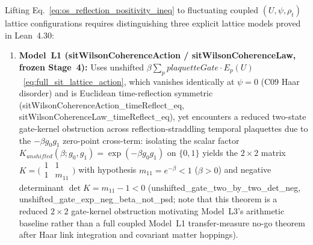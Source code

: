\documentclass[american,11pt,letterpaper]{article}
\def\mathrm#1{#1}%
\def\texttt#1{#1}%
\def\emph#1{#1}%
\begin{document}
Lifting Eq.~\eqref{eq:os_reflection_positivity_ineq} to fluctuating coupled $(U, \psi, \rho_t)$ lattice configurations requires distinguishing three explicit lattice models proved in Lean~4.30:
\begin{enumerate}[leftmargin=2em]
  \item \textbf{Model~L1 (\texttt{sit\allowbreak{}Wilson\allowbreak{}Coherence\allowbreak{}Action} / \texttt{sitWilsonCoherenceLaw}, frozen Stage~4):} Uses unshifted $\beta\sum_p \mathrm{plaquetteGate}\cdot E_p(U)$~\eqref{eq:full_sit_lattice_action}, which vanishes identically at $\psi = 0$ (\texttt{C09} Haar disorder) and is Euclidean time-reflection symmetric (\texttt{sit\allowbreak{}Wilson\allowbreak{}Coherence\allowbreak{}Action\_\allowbreak{}time\allowbreak{}Reflect\_\allowbreak{}eq}, \texttt{sit\allowbreak{}Wilson\allowbreak{}Coherence\allowbreak{}Law\_\allowbreak{}time\allowbreak{}Reflect\_\allowbreak{}eq}), yet encounters a \emph{reduced two-state gate-kernel obstruction} across reflection-straddling temporal plaquettes due to the $-\beta g_0 g_1$ zero-point cross-term: isolating the scalar factor $K_{\mathrm{unshifted}}(\beta; g_0, g_1) = \exp(-\beta g_0 g_1)$ on $\{0, 1\}$ yields the $2\times 2$ matrix $K = \bigl(\begin{smallmatrix}1 & 1\\ 1 & m_{11}\end{smallmatrix}\bigr)$ with hypothesis $m_{11} = e^{-\beta} < 1$ ($\beta > 0$) and negative determinant $\det K = m_{11} - 1 < 0$ (\texttt{unshifted\_\allowbreak{}gate\_\allowbreak{}two\_\allowbreak{}by\_\allowbreak{}two\_\allowbreak{}det\_\allowbreak{}neg}, \texttt{unshifted\_\allowbreak{}gate\_\allowbreak{}exp\_\allowbreak{}neg\_\allowbreak{}beta\_\allowbreak{}not\_\allowbreak{}psd}; note that this theorem is a reduced $2\times 2$ gate-kernel obstruction motivating Model~L3's arithmetic baseline rather than a full coupled Model~L1 transfer-measure no-go theorem after Haar link integration and covariant matter hoppings).

\end{enumerate}
\end{document}
